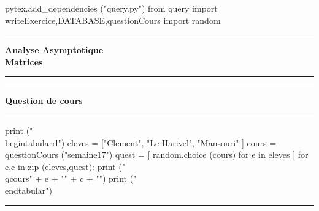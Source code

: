 \documentclass[11pt]{article}
\newcounter{exo}
\newcommand{\qcours}[2]{\textbf{#1} & #2 \\}
\begin{document}
    \begin{pycode}
pytex.add_dependencies ("query.py")
from query import writeExercice,DATABASE,questionCours
import random
    \end{pycode}


\begin{center}
\rule{15em}{2pt}


\vspace{1em}
\textbf{\huge{Analyse Asymptotique \\ Matrices}}
\vspace{0.5em}


\rule{15em}{2pt}
\end{center}



    \begin{center}
        \rule[0.23em]{1.5em}{1pt} 
        \textbf{Question de cours}
        \rule[0.23em]{24em}{1pt}
    \end{center}
    

\begin{center}
\begin{minipage}{0.8\linewidth}
    \begin{pycode}
print ("\\begin{tabular}{rl}")
eleves = ["Clement", "Le Harivel", "Mansouri" ] 
cours  = questionCours ("semaine17")
quest  = [ random.choice (cours) for e in eleves ] 
for e,c in zip (eleves,quest):
    print ("\\qcours{" + e + "}{" + c +  "}")
print ("\\end{tabular}")
    \end{pycode}
\end{minipage}
\end{center}

    \begin{center}
        \rule{35em}{1pt}
    \end{center}
    
\end{document}
